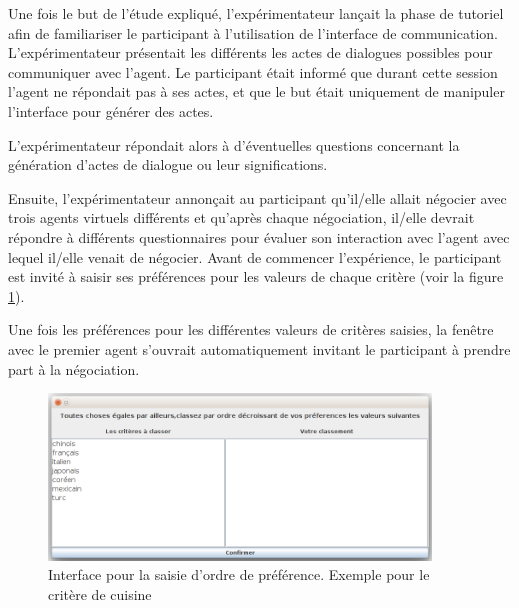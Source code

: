 	
	Une fois le but de l'étude expliqué, l'expérimentateur lançait la phase de tutoriel afin de familiariser le participant à l'utilisation de l'interface de communication. 	L'expérimentateur présentait les différents les actes de dialogues possibles pour communiquer avec l'agent. 	
	Le participant était informé que durant cette session l'agent ne répondait pas à ses actes, et que le but était uniquement de manipuler l'interface pour générer des actes. 
	
	L’expérimentateur répondait alors à d’éventuelles questions concernant la génération d'actes de dialogue ou leur significations.
	
	Ensuite, l’expérimentateur annonçait au participant qu’il/elle allait négocier avec trois  agents virtuels différents et
	qu’après chaque négociation, il/elle devrait répondre à différents questionnaires pour évaluer son interaction avec l’agent avec lequel il/elle venait de négocier.  Avant de commencer l'expérience, le participant est invité à saisir ses préférences pour les valeurs de chaque critère (voir la figure \ref{fig:pref}).
	
	Une fois les préférences pour les différentes valeurs de critères saisies, la fenêtre avec le premier agent s'ouvrait automatiquement invitant le participant à prendre part à la négociation. 
	
	\begin{figure}[b]
		\includegraphics[width=4in]{Figures/pref.png}
		\caption{\label{fig:pref} Interface pour la saisie d'ordre de préférence. Exemple pour le critère de cuisine}
	\end{figure} 
	
	
